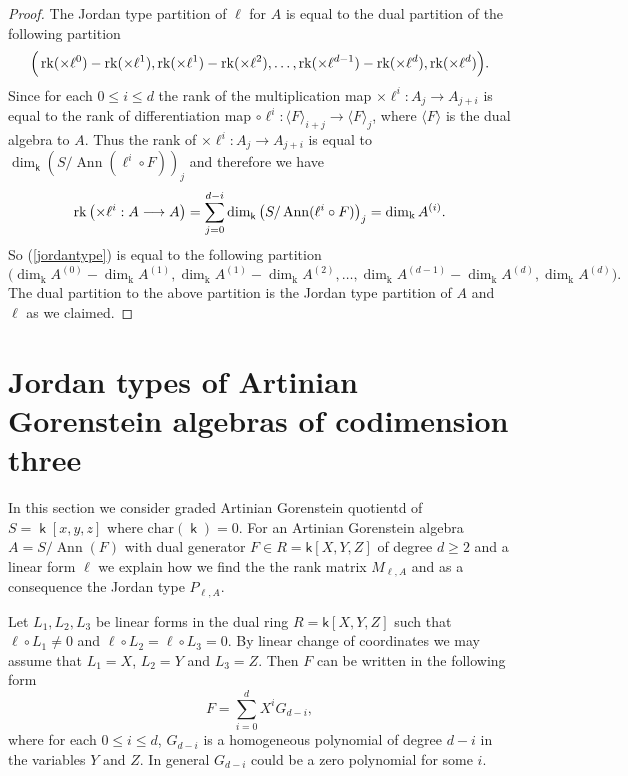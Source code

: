\documentclass[12pt]{amsart}
\numberwithin{equation}{section}
\theoremstyle{plain} \newtheorem{theorem}{Theorem}[section]
\theoremstyle{definition} \newtheorem{definition}[theorem]{Definition}
\DeclareMathOperator{\ann}{Ann}\DeclareMathOperator{\Char}{char}
\DeclareMathOperator{\K}{\mathsf{k}}
\begin{document}
\begin{proof}
The Jordan type partition of $\ell$ for $A$ is equal to the dual partition of the following partition 
\begin{equation}\label{jordantype}
\Big(\operatorname{rk} (\times \ell^0)-\operatorname{rk} (\times \ell^1),\operatorname{rk} (\times \ell^1)-\operatorname{rk} (\times \ell^2),\dots , \operatorname{rk} (\times \ell^{d-1})-\operatorname{rk} (\times \ell^d),\operatorname{rk} (\times \ell^d)\Big).
\end{equation}
Since for each $0\leq i\leq d$ the rank of the multiplication map $ \times \ell^{i}:A_j\longrightarrow A_{j+i}$ is equal to the rank of differentiation map  $\circ \ell^i :\langle F \rangle_{i+j}\longrightarrow\langle F\rangle_{j}$, where $\langle F\rangle$  is the dual algebra to $A$. Thus the rank of $ \times \ell^i:A_j\longrightarrow A_{j+i}$ is equal to $\dim_{\K}\left( S/\ann(\ell^i\circ F)\right)_j$ and therefore we have 
$$\rk \left( \times \ell^i: A\longrightarrow A\right) = \sum^{d-i}_{j=0} \dim_{\K}\left( S/\ann(\ell^i\circ F)\right)_j=\dim_{\mathrm{k}}A^{(i)}.$$
So (\ref{jordantype}) is equal to the following partition
$$
\big(\dim_{\mathrm{k}}A^{(0)}-\dim_{\mathrm{k}}A^{(1)},\dim_{\mathrm{k}}A^{(1)}-\dim_{\mathrm{k}}A^{(2)},\dots ,\dim_{\mathrm{k}}A^{({d-1})}-\dim_{\mathrm{k}}A^{(d)},\dim_{\mathrm{k}}A^{(d)}\big).
$$
The dual partition to the above partition is the Jordan type partition of $A$ and $\ell$ as we claimed.
\end{proof}

\section{Jordan types of Artinian  Gorenstein algebras of codimension three}\label{codim3section}
In this section we consider graded Artinian Gorenstein quotientd of $S=\K[x,y,z]$ where $\mathrm{char}(\K)=0$. For an  Artinian  Gorenstein algebra  $A=S/\ann(F)$ with dual generator $F\in R=\mathsf{k}[X,Y,Z]$ of degree $d\geq 2$ and a linear form $\ell$ we explain how we find the the rank matrix $M_{\ell,A}$ and as a consequence the Jordan type $P_{\ell,A}$.  

Let $L_1, L_2,L_3$ be linear forms in the dual ring $R=\mathsf{k}[X,Y,Z]$  such that $\ell\circ L_1\neq 0$ and $\ell\circ L_2=\ell\circ L_3 = 0$.
By linear change of coordinates we may assume that $L_1=X$, $L_2=Y$ and $L_3=Z$. Then $F$ can be written in the following form 
$$
F = \sum_{i=0}^dX^iG_{d-i},
$$
where for each $0\leq i\leq d$, $G_{d-i}$ is a homogeneous polynomial of degree $d-i$ in the variables $Y$ and $Z$. In general $G_{d-i}$ could be a zero polynomial for some $i$. 
\end{document}

